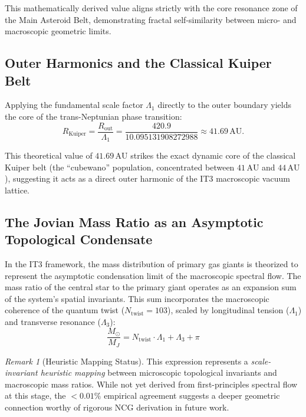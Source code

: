 \documentclass[11pt,a4paper]{article}
\theoremstyle{remark}
\newtheorem{remark}[theorem]{Remark}
\newcommand{\AU}{\,\mathrm{AU}}
\newcommand{\Ntwist}{N_{\mathrm{twist}}}
\newcommand{\Lone}{\Lambda_1}
\newcommand{\Lthree}{\Lambda_3}
\newcommand{\LoneVal}{10.095131908272988}
\begin{document}
This mathematically derived value aligns strictly with the core resonance zone of the Main Asteroid Belt, demonstrating fractal self-similarity between micro- and macroscopic geometric limits. 

\subsection{Outer Harmonics and the Classical Kuiper Belt}

Applying the fundamental scale factor $\Lone$ directly to the outer boundary yields the core of the trans-Neptunian phase transition:
\begin{equation}
    R_{\text{Kuiper}} = \frac{R_{\text{out}}}{\Lone} = \frac{420.9}{\LoneVal} \approx 41.69 \AU.
\end{equation}

This theoretical value of $41.69\AU$ strikes the exact dynamic core of the classical Kuiper belt (the ``cubewano'' population, concentrated between $41\AU$ and $44\AU$), suggesting it acts as a direct outer harmonic of the IT3 macroscopic vacuum lattice.

\subsection{The Jovian Mass Ratio as an Asymptotic Topological Condensate}
\label{sec:jupiter_mass}

In the IT3 framework, the mass distribution of primary gas giants is theorized to represent the asymptotic condensation limit of the macroscopic spectral flow. The mass ratio of the central star to the primary giant operates as an expansion sum of the system's spatial invariants. This sum incorporates the macroscopic coherence of the quantum twist ($N_{\text{twist}} = 103$), scaled by longitudinal tension ($\Lone$) and transverse resonance ($\Lthree$):
\begin{equation}
    \frac{M_\odot}{M_J} = \Ntwist \cdot \Lone + \Lthree + \pi
    \label{eq:jupiter_ratio}
\end{equation}

\begin{remark}[Heuristic Mapping Status]
This expression represents a \textit{scale-invariant heuristic mapping} between microscopic topological invariants and macroscopic mass ratios. While not yet derived from first-principles spectral flow at this stage, the $<0.01\%$ empirical agreement suggests a deeper geometric connection worthy of rigorous NCG derivation in future work.
\end{remark}
\end{document}
